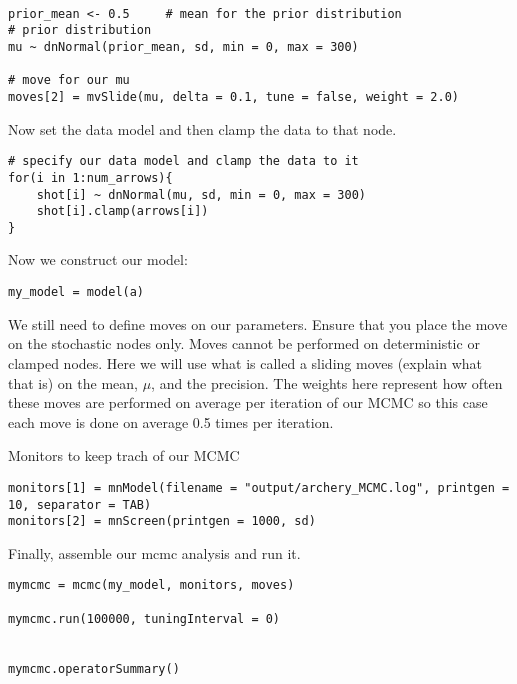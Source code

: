 {\tt \begin{snugshade*}
 \begin{lstlisting}
 
prior_mean <- 0.5     # mean for the prior distribution
# prior distribution 
mu ~ dnNormal(prior_mean, sd, min = 0, max = 300)

# move for our mu
moves[2] = mvSlide(mu, delta = 0.1, tune = false, weight = 2.0)
\end{lstlisting}
\end{snugshade*}}

Now set the data model and then clamp the data to that node.

{\tt \begin{snugshade*}
 \begin{lstlisting}
# specify our data model and clamp the data to it
for(i in 1:num_arrows){
	shot[i] ~ dnNormal(mu, sd, min = 0, max = 300)
	shot[i].clamp(arrows[i])
}
\end{lstlisting}
\end{snugshade*}}

Now we construct our model:

{\tt \begin{snugshade*}
 \begin{lstlisting}
my_model = model(a)
\end{lstlisting}
\end{snugshade*}}


We still need to define moves on our parameters. Ensure that you place the move on the stochastic nodes only. Moves cannot be performed on deterministic or clamped nodes. Here we will use what is called a sliding moves (explain what that is) on the mean, $\mu$, and the precision. The weights here represent how often these moves are performed on average per iteration of our MCMC so this case each move is done on average 0.5 times per iteration. 


Monitors to keep trach of our MCMC
{\tt \begin{snugshade*}
 \begin{lstlisting}
monitors[1] = mnModel(filename = "output/archery_MCMC.log", printgen = 10, separator = TAB)
monitors[2] = mnScreen(printgen = 1000, sd)

 \end{lstlisting}
\end{snugshade*}}

Finally, assemble our mcmc analysis and run it.

{\tt \begin{snugshade*}
 \begin{lstlisting}
mymcmc = mcmc(my_model, monitors, moves)

mymcmc.run(100000, tuningInterval = 0)


mymcmc.operatorSummary()
 \end{lstlisting}
\end{snugshade*}}

